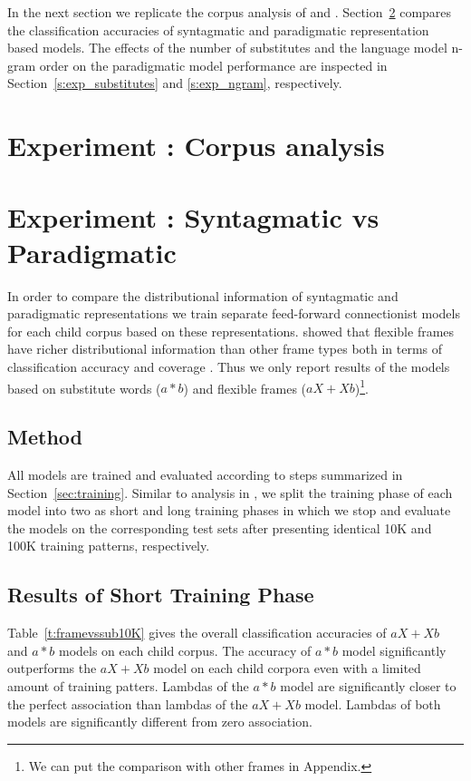 In the next section we replicate the corpus analysis of \cite{Mintz200391} and
\cite{clair2010}.  Section~\ref{s:exp_paradigmatic} compares the classification
accuracies of syntagmatic and paradigmatic representation based models.  The
effects of the number of substitutes and the language model n-gram order on the
paradigmatic model performance are inspected in Section~\ref{s:exp_substitutes}
and \ref{s:exp_ngram}, respectively. 

\section{Experiment : Corpus analysis}
\label{s:exp_corpus}
\section{Experiment : Syntagmatic vs Paradigmatic}
\label{s:exp_paradigmatic}

In order to compare the distributional information of syntagmatic and
paradigmatic representations we train separate feed-forward connectionist
models for each child corpus based on these representations.  \cite{clair2010}
showed that flexible frames have richer distributional information than other
frame types both in terms of classification accuracy and coverage .  Thus we
only report results of the models based on substitute words ($a*b$) and
flexible frames ($aX+Xb$)\footnote{We can put the comparison with other frames
in Appendix.  }. 

\subsection{Method} 
All models are trained and evaluated according to steps summarized in
Section~\ref{sec:training}.  Similar to analysis in \cite{clair2010}, we split
the training phase of each model into two as short and long training phases in
which we stop and evaluate the models on the corresponding test sets after
presenting identical 10K and 100K training patterns, respectively.  

\subsection{Results of Short Training Phase}
Table~\ref{t:framevssub10K} gives the overall classification accuracies of
$aX+Xb$ and $a*b$ models on each child corpus.  The accuracy of $a*b$ model
significantly outperforms the $aX+Xb$ model on each child corpora even with a
limited amount of training patters.  Lambdas of the $a*b$ model are
significantly closer to the perfect association than lambdas of the $aX+Xb$
model.  Lambdas of both models are significantly different from zero
association.


